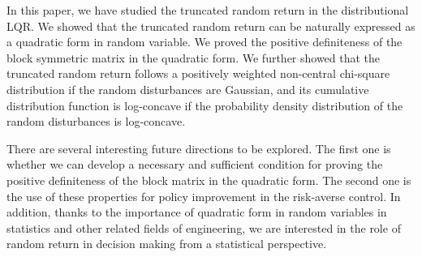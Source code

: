 \documentclass[letterpaper, 10 pt, conference]{ieeeconf}  %
\begin{document}
In this paper, we have studied the truncated random return in the distributional LQR. We showed that the truncated random return can be naturally expressed as a quadratic form in random variable.  We proved the positive definiteness of the block symmetric matrix in the quadratic form. We further showed that the truncated random return follows a positively weighted non-central chi-square distribution if the random disturbances are Gaussian, and its cumulative distribution function is log-concave if the probability density distribution of the random disturbances is log-concave. 

There are several interesting future directions to be explored. 
The first one is whether we can develop a necessary and sufficient condition for proving the positive definiteness of the block matrix in the quadratic form. The second one is the use of these properties for policy improvement in the risk-averse control. In addition, thanks to the importance of quadratic form in random variables in statistics and other related fields of engineering, we are interested in the role of random return in decision making from a statistical perspective.
 



     
\end{document}
